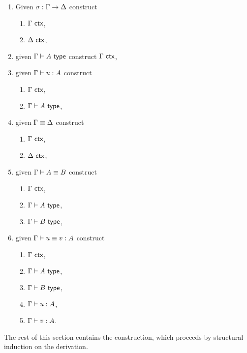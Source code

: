 \begin{problem}
  \label{pbm:sanity}
  \leavevmode
  \begin{enumerate}
  \item \label{sane-issubst} Given $\sigma : \Gamma \to \Delta$ construct
    \begin{enumerate}
    \item $\Gamma\ \mathsf{ctx}$,
    \item $\Delta\ \mathsf{ctx}$,
    \end{enumerate}
  \item \label{sane-istype}  given $\Gamma \vdash A \ \mathsf{type}$ construct $\Gamma\ \mathsf{ctx}$,
  \item \label{sane-isterm}  given $\Gamma \vdash u : A$ construct
    \begin{enumerate}
    \item $\Gamma\ \mathsf{ctx}$,
    \item $\Gamma \vdash A \ \mathsf{type}$,
    \end{enumerate}
  \item \label{sane-eqctx}   given $\Gamma \equiv \Delta$ construct
    \begin{enumerate}
    \item $\Gamma\ \mathsf{ctx}$,
    \item $\Delta\ \mathsf{ctx}$,
    \end{enumerate}
  \item \label{sane-eqtype}  given $\Gamma \vdash A \equiv B$ construct
    \begin{enumerate}
    \item $\Gamma\ \mathsf{ctx}$,
    \item $\Gamma \vdash A \ \mathsf{type}$,
    \item $\Gamma \vdash B \ \mathsf{type}$,
    \end{enumerate}
  \item \label{sane-eqterm}  given $\Gamma \vdash u \equiv v : A$ construct
    \begin{enumerate}
    \item $\Gamma\ \mathsf{ctx}$,
    \item $\Gamma \vdash A \ \mathsf{type}$,
    \item $\Gamma \vdash B \ \mathsf{type}$,
    \item $\Gamma \vdash u : A$,
    \item $\Gamma \vdash v : A$.
    \end{enumerate}
  \end{enumerate}
\end{problem}
%
The rest of this section contains the construction, which proceeds by structural induction on the
derivation.


